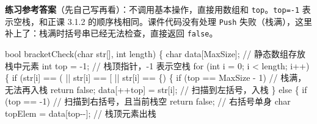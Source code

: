 \documentclass[10.5pt,a4paper,oneside]{article}
\newenvironment{Shaded}{}{}
\newcommand{\CharTok}[1]{\textcolor[rgb]{0.63,0.19,0.43}{#1}}
\newcommand{\CommentTok}[1]{\textcolor[rgb]{0.18,0.55,0.23}{#1}}
\newcommand{\ControlFlowTok}[1]{\textcolor[rgb]{0.12,0.31,0.71}{#1}}
\newcommand{\DataTypeTok}[1]{\textcolor[rgb]{0.12,0.31,0.71}{#1}}
\newcommand{\DecValTok}[1]{\textcolor[rgb]{0.77,0.35,0.07}{#1}}
\newcommand{\KeywordTok}[1]{\textcolor[rgb]{0.12,0.31,0.71}{#1}}
\newcommand{\NormalTok}[1]{#1}
\newcommand{\OperatorTok}[1]{\textcolor[rgb]{0.20,0.20,0.20}{#1}}
\begin{document}
\begin{addbox}

\textbf{练习参考答案}（先自己写再看）：不调用基本操作，直接用数组和
\texttt{top}。\texttt{top=-1} 表示空栈，和正课 3.1.2
的顺序栈相同。课件代码没有处理 \texttt{Push}
失败（栈满），这里补上了：栈满时括号串已经无法检查，直接返回
\texttt{false}。

\begin{Shaded}
\begin{Highlighting}[]
\DataTypeTok{bool}\NormalTok{ bracketCheck}\OperatorTok{(}\DataTypeTok{char}\NormalTok{ str}\OperatorTok{[],} \DataTypeTok{int}\NormalTok{ length}\OperatorTok{)} \OperatorTok{\{}
    \DataTypeTok{char}\NormalTok{ data}\OperatorTok{[}\NormalTok{MaxSize}\OperatorTok{];}             \CommentTok{// 静态数组存放栈中元素}
    \DataTypeTok{int}\NormalTok{ top }\OperatorTok{=} \OperatorTok{{-}}\DecValTok{1}\OperatorTok{;}                   \CommentTok{// 栈顶指针，{-}1 表示空栈}
    \ControlFlowTok{for} \OperatorTok{(}\DataTypeTok{int}\NormalTok{ i }\OperatorTok{=} \DecValTok{0}\OperatorTok{;}\NormalTok{ i }\OperatorTok{\textless{}}\NormalTok{ length}\OperatorTok{;}\NormalTok{ i}\OperatorTok{++)} \OperatorTok{\{}
        \ControlFlowTok{if} \OperatorTok{(}\NormalTok{str}\OperatorTok{[}\NormalTok{i}\OperatorTok{]} \OperatorTok{==} \CharTok{\textquotesingle{}(\textquotesingle{}} \OperatorTok{||}\NormalTok{ str}\OperatorTok{[}\NormalTok{i}\OperatorTok{]} \OperatorTok{==} \CharTok{\textquotesingle{}[\textquotesingle{}} \OperatorTok{||}\NormalTok{ str}\OperatorTok{[}\NormalTok{i}\OperatorTok{]} \OperatorTok{==} \CharTok{\textquotesingle{}\{\textquotesingle{}}\OperatorTok{)} \OperatorTok{\{}
            \ControlFlowTok{if} \OperatorTok{(}\NormalTok{top }\OperatorTok{==}\NormalTok{ MaxSize }\OperatorTok{{-}} \DecValTok{1}\OperatorTok{)} \CommentTok{// 栈满，无法再入栈}
                \ControlFlowTok{return} \KeywordTok{false}\OperatorTok{;}
\NormalTok{            data}\OperatorTok{[++}\NormalTok{top}\OperatorTok{]} \OperatorTok{=}\NormalTok{ str}\OperatorTok{[}\NormalTok{i}\OperatorTok{];}   \CommentTok{// 扫描到左括号，入栈}
        \OperatorTok{\}} \ControlFlowTok{else} \OperatorTok{\{}
            \ControlFlowTok{if} \OperatorTok{(}\NormalTok{top }\OperatorTok{==} \OperatorTok{{-}}\DecValTok{1}\OperatorTok{)}          \CommentTok{// 扫描到右括号，且当前栈空}
                \ControlFlowTok{return} \KeywordTok{false}\OperatorTok{;}       \CommentTok{// 右括号单身}
            \DataTypeTok{char}\NormalTok{ topElem }\OperatorTok{=}\NormalTok{ data}\OperatorTok{[}\NormalTok{top}\OperatorTok{{-}{-}];}     \CommentTok{// 栈顶元素出栈}

\end{Highlighting}
\end{Shaded}
\end{addbox}
\end{document}

